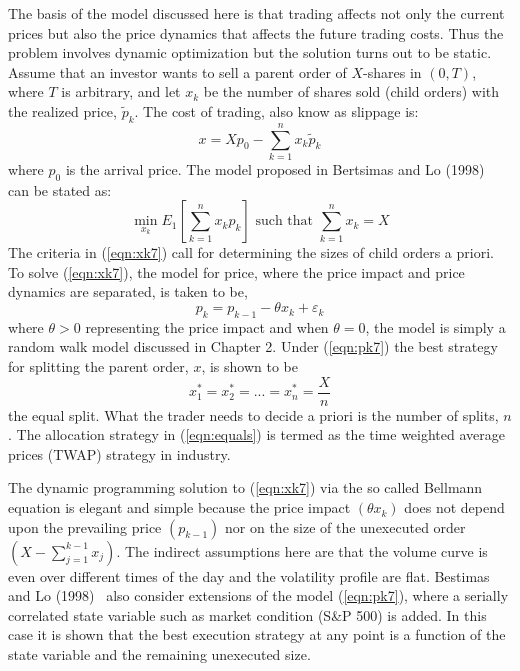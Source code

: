 The basis of the model discussed here is that trading affects not only the current prices but also the price dynamics that affects the future trading costs. Thus the problem involves dynamic optimization but the solution turns out to be static. Assume that an investor wants to sell a parent order of $X$-shares in $(0,T)$, where $T$ is arbitrary, and let $x_k$ be the number of shares sold (child orders) with the realized price, $\widetilde{p}_k$. The cost of trading, also know as slippage is:
	\begin{equation}\label{eqn:x7}
	x = Xp_0 - \sum_{k=1}^n x_k\widetilde{p}_k
	\end{equation}
where $p_0$ is the arrival price. The model proposed in Bertsimas and Lo (1998)~\cite{berlo} can be stated as:
	\begin{equation}\label{eqn:xk7}
	\min_{x_k} E_1 \left[\sum_{k=1}^n x_kp_k\right] \text{ such that }\sum_{k=1}^n x_k=X
	\end{equation}
The criteria in (\ref{eqn:xk7}) call for determining the sizes of child orders a priori. To solve (\ref{eqn:xk7}), the model for price, where the price impact and price dynamics are separated, is taken to be,
	\begin{equation}\label{eqn:pk7}
	p_k = p_{k-1} - \theta x_k + \varepsilon_k
	\end{equation}
where $\theta > 0$ representing the price impact and when $\theta = 0$, the model is simply a random walk model discussed in Chapter 2. Under (\ref{eqn:pk7}) the best strategy for splitting the parent order, $x$, is shown to be
	\begin{equation}\label{eqn:equals}
	x_1^* = x_2^* =...= x_n^* = \frac{X}{n}
	\end{equation}
the equal split. What the trader needs to decide a priori is the number of splits, $n$. The allocation strategy in (\ref{eqn:equals}) is termed as the time weighted average prices (TWAP) strategy in industry. 


The dynamic programming solution to (\ref{eqn:xk7}) via the so called Bellmann equation is elegant and simple because the price impact $(\theta x_k)$ does not depend upon the prevailing price $(p_{k-1})$ nor on the size of the unexecuted order $(X - \sum_{j=1}^{k-1} x_j)$. The indirect assumptions here are that the volume curve is even over different times of the day and the volatility profile are flat. Bestimas and Lo (1998)~\cite{berlo} also consider extensions of the model (\ref{eqn:pk7}), where a serially correlated state variable such as market condition (S\&P 500) is added. In this case it is shown that the best execution strategy at any point is a function of the state variable and the remaining unexecuted size. 


